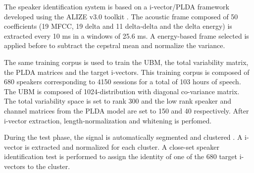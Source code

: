 The speaker identification system is based on a i-vector/PLDA framework developed using the ALIZE v3.0 toolkit \cite{larcher2013}. The acoustic frame composed of 50 coefficients (19 MFCC, 19 delta and 11 delta-delta and the delta energy) is extracted every 10 ms in a windows of 25.6 ms. A energy-based frame selected is applied before to subtract the cepstral mean and normalize the variance. 

The same training corpus is used to train the UBM, the total variability matrix, the PLDA matrices and the target i-vectors. This training corpus is composed of 680 speakers corresponding to 4150 sessions for a total of 103 hours of speech. The UBM is composed of 1024-distribution with diagonal co-variance matrix. The total variability space is set to rank 300 and the low rank speaker and channel matrices from the PLDA model are set to 150 and 40 respectively. After i-vector extraction, length-normalization and whitening is perfomed.

During the test phase, the signal is automatically segmented and clustered \cite{dupuy2014}. A i-vector is extracted and normalized for each cluster. A close-set speaker identification test is performed to assign the identity of one of the 680 target i-vectors to the cluster. 

 